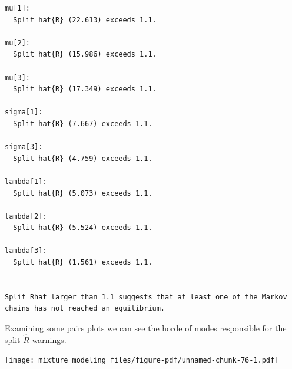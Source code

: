 \documentclass[
  letterpaper,
  DIV=11,
  numbers=noendperiod]{scrartcl}
\newenvironment{Shaded}{\begin{snugshade}}{\end{snugshade}}
\newcommand{\ControlFlowTok}[1]{\textcolor[rgb]{0.00,0.23,0.31}{#1}}
\newcommand{\DecValTok}[1]{\textcolor[rgb]{0.68,0.00,0.00}{#1}}
\newcommand{\FunctionTok}[1]{\textcolor[rgb]{0.28,0.35,0.67}{#1}}
\newcommand{\NormalTok}[1]{\textcolor[rgb]{0.00,0.23,0.31}{#1}}
\newcommand{\OtherTok}[1]{\textcolor[rgb]{0.00,0.23,0.31}{#1}}
\newcommand{\SpecialCharTok}[1]{\textcolor[rgb]{0.37,0.37,0.37}{#1}}
\newcommand{\StringTok}[1]{\textcolor[rgb]{0.13,0.47,0.30}{#1}}
\begin{document}
\begin{verbatim}
mu[1]:
  Split hat{R} (22.613) exceeds 1.1.

mu[2]:
  Split hat{R} (15.986) exceeds 1.1.

mu[3]:
  Split hat{R} (17.349) exceeds 1.1.

sigma[1]:
  Split hat{R} (7.667) exceeds 1.1.

sigma[3]:
  Split hat{R} (4.759) exceeds 1.1.

lambda[1]:
  Split hat{R} (5.073) exceeds 1.1.

lambda[2]:
  Split hat{R} (5.524) exceeds 1.1.

lambda[3]:
  Split hat{R} (1.561) exceeds 1.1.


Split Rhat larger than 1.1 suggests that at least one of the Markov
chains has not reached an equilibrium.
\end{verbatim}

Examining some pairs plots we can see the horde of modes responsible for
the split \(\hat{R}\) warnings.

\begin{Shaded}
\end{Shaded}

\texttt{[image: mixture\_modeling\_files/figure-pdf/unnamed-chunk-76-1.pdf]}

\begin{Shaded}
\end{Shaded}
\end{document}
